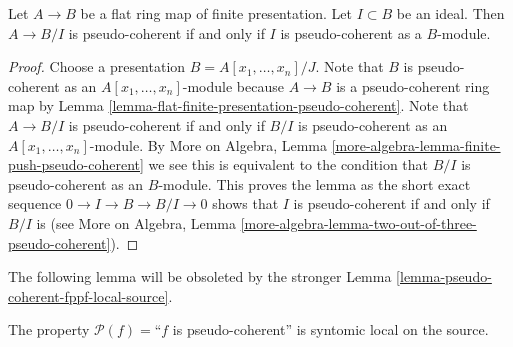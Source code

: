 \begin{lemma}
\label{lemma-quotient-of-flat-finitely-presented}
Let $A \to B$ be a flat ring map of finite presentation.
Let $I \subset B$ be an ideal. Then $A \to B/I$ is pseudo-coherent
if and only if $I$ is pseudo-coherent as a $B$-module.
\end{lemma}

\begin{proof}
Choose a presentation $B = A[x_1, \ldots, x_n]/J$.
Note that $B$ is pseudo-coherent as an $A[x_1, \ldots, x_n]$-module
because $A \to B$ is a pseudo-coherent ring map by
Lemma \ref{lemma-flat-finite-presentation-pseudo-coherent}.
Note that $A \to B/I$ is pseudo-coherent if and only if
$B/I$ is pseudo-coherent as an $A[x_1, \ldots, x_n]$-module. By
More on Algebra, Lemma \ref{more-algebra-lemma-finite-push-pseudo-coherent}
we see this is equivalent to the condition that $B/I$ is
pseudo-coherent as an $B$-module. This proves the lemma as the
short exact sequence $0 \to I \to B \to B/I \to 0$
shows that $I$ is pseudo-coherent if and only if $B/I$ is (see
More on Algebra,
Lemma \ref{more-algebra-lemma-two-out-of-three-pseudo-coherent}).
\end{proof}

\noindent
The following lemma will be obsoleted by the stronger
Lemma \ref{lemma-pseudo-coherent-fppf-local-source}.

\begin{lemma}
\label{lemma-pseudo-coherent-syntomic-local-source}
The property $\mathcal{P}(f) =$``$f$ is pseudo-coherent''
is syntomic local on the source.
\end{lemma}

